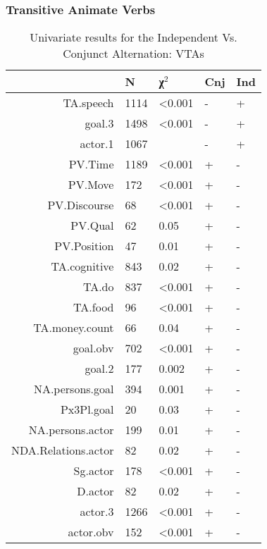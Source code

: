 \FloatBarrier

\subsubsection{Transitive Animate Verbs}



\begin{table}[H]
  \centering
  \footnotesize
\begin{tabular}{rllll}
    \toprule
 & N & χ$^{2}$ & Cnj & Ind \\ 
\midrule
TA.speech       & 1114 & \textless{}0.001 & - & + \\
goal.3          & 1498 & \textless{}0.001 & - & + \\
actor.1         & 1067 &  & - & + \\


PV.Time         & 1189 & \textless{}0.001 & + & - \\
PV.Move         & 172 & \textless{}0.001 & + & - \\
PV.Discourse    & 68 & \textless{}0.001 & + & - \\
PV.Qual         & 62 & 0.05 & + & - \\
PV.Position     & 47 & 0.01 & + & - \\
TA.cognitive    & 843 & 0.02 & + & - \\
TA.do           & 837 & \textless{}0.001 & + & - \\
TA.food         & 96 & \textless{}0.001 & + & - \\
TA.money.count  & 66 & 0.04 & + & - \\


goal.obv & 702   & \textless{}0.001 & + & - \\
goal.2           & 177 & 0.002 & + & - \\
NA.persons.goal  & 394 & 0.001 & + & - \\
Px3Pl.goal & 20  & 0.03 & + & - \\

NA.persons.actor & 199 & 0.01 & + & - \\
NDA.Relations.actor & 82 & 0.02 & + & - \\
Sg.actor         & 178   & \textless{}0.001 & + & - \\
D.actor          & 82 & 0.02 & + & - \\
actor.3          & 1266 & \textless{}0.001 & + & - \\
actor.obv        & 152 & \textless{}0.001 & + & - \\

  \bottomrule
  \end{tabular}
  \caption{
   Univariate results for the Independent Vs. Conjunct Alternation: VTAs \\ \label{tab:tancnjuni}
  }
\end{table}


